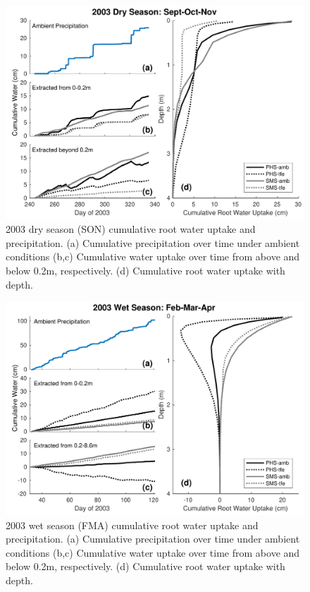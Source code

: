 \documentclass[draft,linenumbers]{agujournal}
\begin{document}
        \clearpage
    \begin{figure}[h]
     \centering
     \includegraphics[width=30pc]{../figs3/qdry.pdf}
     \caption{2003 dry season (SON) cumulative root water uptake and precipitation. 
     (a) Cumulative precipitation over time under ambient conditions
     (b,c) Cumulative water uptake over time from above and below 0.2m, respectively.
     (d) Cumulative root water uptake with depth.
     }
     \label{fig:qdry}
  \end{figure}
  
        \clearpage
    \begin{figure}[h]
     \centering
     \includegraphics[width=30pc]{../figs3/qwet.pdf}
     \caption{2003 wet season (FMA) cumulative root water uptake and precipitation. 
     (a) Cumulative precipitation over time under ambient conditions
     (b,c) Cumulative water uptake over time from above and below 0.2m, respectively.
     (d) Cumulative root water uptake with depth.
     }
     \label{fig:qwet}
  \end{figure}
  
\end{document}
